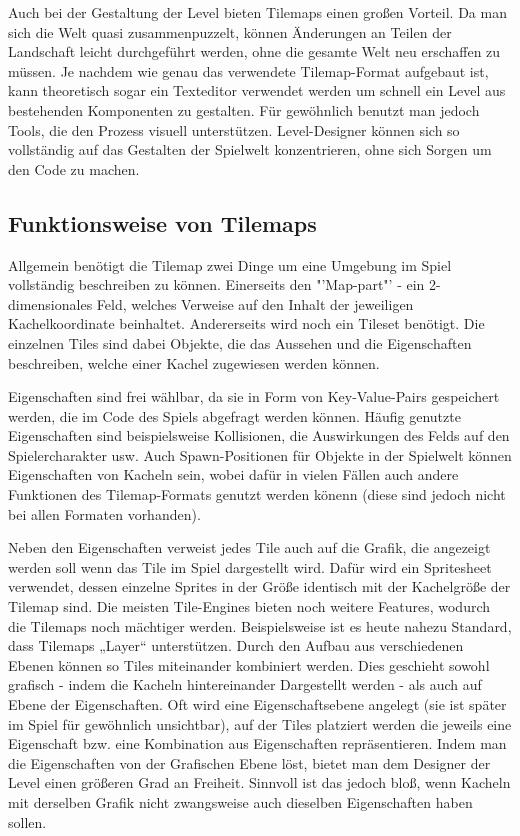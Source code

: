 Auch bei der Gestaltung der Level bieten Tilemaps einen großen Vorteil. Da man sich die Welt quasi zusammenpuzzelt, können Änderungen an Teilen der Landschaft leicht durchgeführt werden, ohne die gesamte Welt neu erschaffen zu müssen. Je nachdem wie genau das verwendete Tilemap-Format aufgebaut ist, kann theoretisch sogar ein Texteditor verwendet werden um schnell ein Level aus bestehenden Komponenten zu gestalten. Für gewöhnlich benutzt man jedoch Tools, die den Prozess visuell unterstützen. Level-Designer können sich so vollständig auf das Gestalten der Spielwelt konzentrieren, ohne sich Sorgen um den Code zu machen.

\subsection{Funktionsweise von Tilemaps}
Allgemein benötigt die Tilemap zwei Dinge um eine Umgebung im Spiel vollständig beschreiben zu können. Einerseits den "'Map-part"' - ein 2-dimensionales Feld, welches Verweise auf den Inhalt der jeweiligen Kachelkoordinate beinhaltet. Andererseits wird noch ein Tileset benötigt. Die einzelnen Tiles sind dabei Objekte, die das Aussehen und die Eigenschaften beschreiben, welche einer Kachel zugewiesen werden können.

Eigenschaften sind frei wählbar, da sie in Form von Key-Value-Pairs gespeichert werden, die im Code des Spiels abgefragt werden können. Häufig genutzte Eigenschaften sind beispielsweise Kollisionen, die Auswirkungen des Felds auf den Spielercharakter usw. Auch Spawn-Positionen für Objekte in der Spielwelt können Eigenschaften von Kacheln sein, wobei dafür in vielen Fällen auch andere Funktionen des Tilemap-Formats genutzt werden könenn (diese sind jedoch nicht bei allen Formaten vorhanden). 

Neben den Eigenschaften verweist jedes Tile auch auf die Grafik, die angezeigt werden soll wenn das Tile im Spiel dargestellt wird. Dafür wird ein Spritesheet verwendet, dessen einzelne Sprites in der Größe identisch mit der Kachelgröße der Tilemap sind.
Die meisten Tile-Engines bieten noch weitere Features, wodurch die Tilemaps noch mächtiger werden. Beispielsweise ist es heute nahezu Standard, dass Tilemaps „Layer“ unterstützen. Durch den Aufbau aus verschiedenen Ebenen können so Tiles miteinander kombiniert werden. Dies geschieht sowohl grafisch - indem die Kacheln hintereinander Dargestellt werden -  als auch auf Ebene der Eigenschaften. Oft wird eine Eigenschaftsebene angelegt (sie ist später im Spiel für gewöhnlich unsichtbar), auf der Tiles platziert werden die jeweils eine Eigenschaft bzw. eine Kombination aus Eigenschaften repräsentieren. Indem man die Eigenschaften von der Grafischen Ebene löst, bietet man dem Designer der Level einen größeren Grad an Freiheit. Sinnvoll ist das jedoch bloß, wenn Kacheln mit derselben Grafik nicht zwangsweise auch dieselben Eigenschaften haben sollen. 

